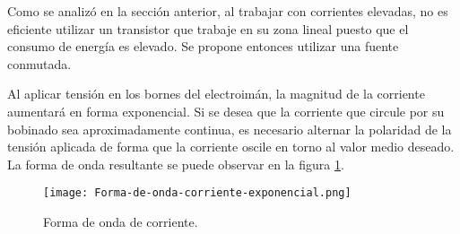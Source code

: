 Como se analizó en la sección anterior, al trabajar con corrientes elevadas, no es eficiente utilizar un transistor que trabaje en su zona lineal puesto que el consumo de energía es elevado. Se propone entonces utilizar una fuente conmutada.


Al aplicar tensión en los bornes del electroimán, la magnitud de la corriente aumentará en forma exponencial. Si se desea que la corriente que circule por su bobinado sea aproximadamente continua, es necesario alternar la polaridad de la tensión aplicada de forma que la corriente oscile en torno al valor medio deseado. La forma de onda resultante se puede observar en la figura \ref{fig:img_corriente_exponencial}.

\begin{figure}[H]
	\centering
	\texttt{[image: Forma-de-onda-corriente-exponencial.png]}
	\caption{Forma de onda de corriente.}
	\label{fig:img_corriente_exponencial}
\end{figure}



